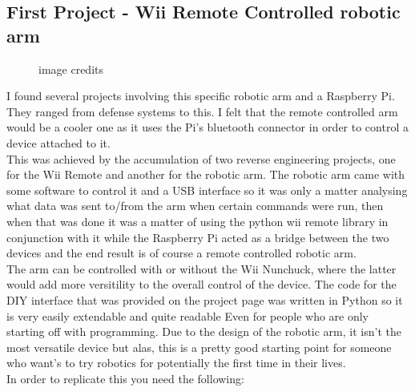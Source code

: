 \documentclass{article}
\begin{document}
	\subsection{First Project - Wii Remote Controlled robotic arm}
		\begin{figure}[h!]
			\centering
			\caption{image credits \citep{boardmasterinstructables}}
		\end{figure}
		I found several projects involving this specific robotic arm and a Raspberry Pi. They ranged from defense systems to this. I felt that the remote controlled arm would be a cooler one as it uses the Pi's bluetooth connector in order to control a device attached to it. \\This was achieved by the accumulation of two reverse engineering projects, one for the Wii Remote and another for the robotic arm. The robotic arm came with some software to control it and a USB interface so it was only a matter analysing what data was sent to/from the arm when certain commands were run, \citep{zaliva} then when that was done it was a matter of using the python wii remote library in conjunction with it while the Raspberry Pi acted as a bridge between the two devices and the end result is of course a remote controlled robotic arm.\\The arm can be controlled with or without the Wii Nunchuck, where the latter would add more versitility to the overall control of the device. The code for the DIY interface that was provided on the project page was written in Python so it is very easily extendable and quite readable Even for people who are only starting off with programming. Due to the design of the robotic arm, it isn't the most versatile device but alas, this is a pretty good starting point for someone who want's to try robotics for potentially the first time in their lives.\\In order to replicate this you need the following:
\end{document}
